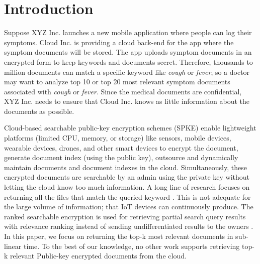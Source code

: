 \documentclass[sigconf,pdftex]{acmart}
\begin{document}
\maketitle



\section{Introduction}

Suppose XYZ Inc. launches a new mobile application where people can log their symptoms. Cloud Inc. is providing a cloud back-end for the app where the symptom documents will be stored. The app uploads symptom documents in an encrypted form to keep keywords and documents secret. Therefore, thousands to million documents can match a specific keyword like \textit{cough} or \textit{fever}, so a doctor may want to analyze top 10 or top 20 most relevant symptom documents associated with \textit{cough} or \textit{fever}. Since the medical documents are confidential, XYZ Inc. needs to ensure that Cloud Inc. knows as little information about the documents as possible.


Cloud-based searchable public-key encryption schemes (SPKE) \cite{boneh2004public, chen2019lightweight, zhang2019fs} enable lightweight platforms (limited CPU, memory, or storage) like sensors, mobile devices, wearable devices, drones, and other smart devices to encrypt the document, generate document index (using the public key), outsource and dynamically maintain documents and document indexes in the cloud. Simultaneously, these encrypted documents are searchable by an admin using the private key without letting the cloud know too much information. A long line of research focuses on returning all the files that match the queried keyword \cite{chen2019lightweight, chen2020a, miao2019lightweight, zhang2019blockchain}. This is not adequate for the large volume of information; that IoT devices can continuously produce. The ranked searchable encryption is used for retrieving partial search query results with relevance ranking instead of sending undifferentiated results to the owners \cite{wang2010secure, wang2011enabling}. In this paper, we focus on returning the top-k most relevant documents in sub-linear time. To the best of our knowledge, no other work supports retrieving top-k relevant Public-key encrypted documents from the cloud.
\end{document}
